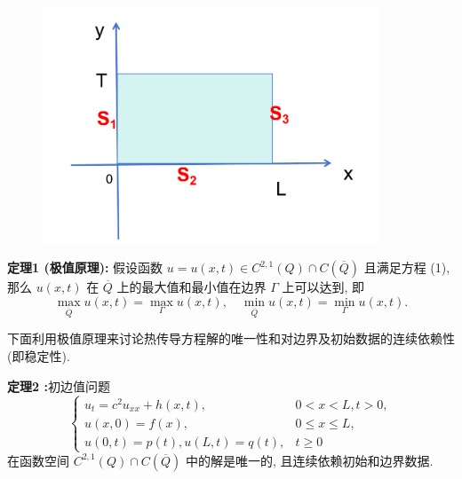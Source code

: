 \begin{figure}[h]%
	\centering
	\includegraphics[width=10cm]{1.png}
\end{figure}

\textbf{定理1 (极值原理):} 假设函数 $ u=u(x, t) \in C^{2,1}(Q) \cap C(\overline{Q}) $ 且满足方程 (1), 那么 $ u(x, t) $ 在 $ \overline{Q} $ 上的最大值和最小值在边界 $ \Gamma $ 上可以达到, 即
$$
\max _{\overline{Q}} u(x, t)=\max _{\Gamma} u(x, t), \quad \min _{\overline{Q}} u(x, t)=\min _{\Gamma} u(x, t) .
$$

下面利用极值原理来讨论热传导方程解的唯一性和对边界及初始数据的连续依赖性 (即稳定性).

\textbf{定理2 :}初边值问题
\begin{equation*}
    \left\{\begin{array}{ll}
u_{t}=c^{2} u_{x x}+h(x, t), & 0<x<L, t>0, \\
u(x, 0)=f(x), & 0 \leqslant x \leqslant L, \\
u(0, t)=p(t), u(L, t)=q(t), & t \geqslant 0
\end{array}\right.\tag{2}
\end{equation*}
在函数空间 $ C^{2,1}(Q) \cap C(\overline{Q}) $ 中的解是唯一的, 且连续依赖初始和边界数据.

